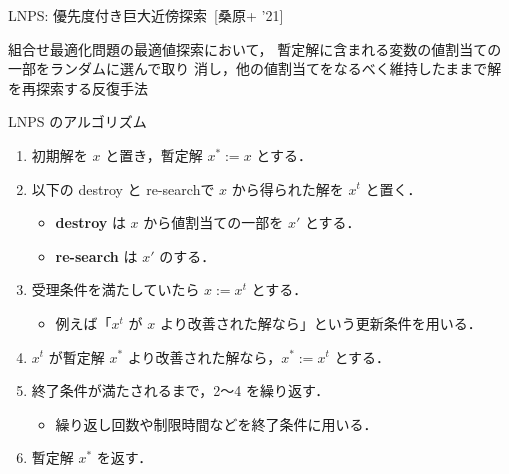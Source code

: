 \documentclass[11pt,dvipdfmx]{beamer}
\begin{document}
\begin{frame}{LNPS: 優先度付き巨大近傍探索~[桑原+ '21]}
  \begin{alertblock}{}\centering
    組合せ最適化問題の最適値探索において，
    暫定解に含まれる変数の値割当ての一部をランダムに選んで取り
    消し，他の値割当てをなるべく維持したままで解を再探索する反復手法
  \end{alertblock}
  \pause
  \begin{block}{\small LNPS のアルゴリズム}
    \begin{enumerate}
      \compress
      \item 初期解を $x$ と置き，暫定解 $x^{*} := x$ とする．
      \item 以下の destroy と re-searchで $x$ から得られた解を $x^{t}$ と置く．
      \begin{itemize}
        \compress
        \item \alert{\bf destroy} は $x$ から値割当ての一部を $x'$ とする．
        \item \alert{\bf re-search} は $x'$ のする．
      \end{itemize}
      \item 受理条件を満たしていたら $x := x^{t}$ とする．
      \begin{itemize}
        \item 例えば「$x^{t}$ が $x$ より改善された解なら」という更新条件を用いる．
      \end{itemize}
      \item $x^{t}$ が暫定解 $x^{*}$ より改善された解なら，$x^{*} := x^{t}$ とする．
      \item 終了条件が満たされるまで，2〜4 を繰り返す．
      \begin{itemize}
        \item 繰り返し回数や制限時間などを終了条件に用いる．
      \end{itemize}
      \item 暫定解 $x^{*}$ を返す．
    \end{enumerate}
  \end{block}
\end{frame}
\end{document}
